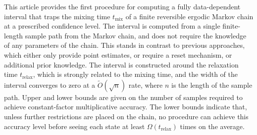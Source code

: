 This article provides the first procedure for computing a fully
data-dependent interval that traps the mixing time
$t_{\text{mix}}$ of a finite
reversible ergodic Markov chain at a prescribed confidence level.  The
interval is computed from a single finite-length sample path from the
Markov chain, and does not require the knowledge of any parameters of
the chain.  This stands in contrast to previous approaches, which
either only provide point estimates, or require a reset mechanism, or
additional prior knowledge.
The interval is constructed around the relaxation time
$t_{\text{relax}}$, which is strongly related to the mixing time, and
the width of the interval converges to zero
at a $\tilde{O}(\sqrt{n})$ rate, where $n$ is the length of the sample path.
Upper and lower bounds are given on the number of samples required to
achieve constant-factor multiplicative accuracy.  The lower bounds
indicate that, unless further restrictions are placed on the chain, no
procedure can achieve this accuracy level before seeing each state at
least $\Omega(t_{\text{relax}})$ times on the average.

